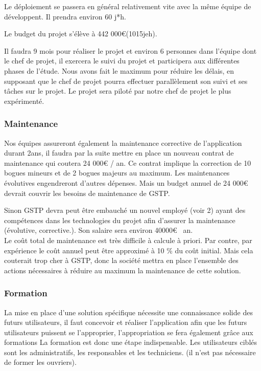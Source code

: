 \begin{description}
\begin{enumerate}
Le déploiement se passera en général relativement vite avec la même équipe de développent. Il prendra environ 60 j*h.

Le budget du projet s'élève à 442 000€(1015jeh).

Il faudra 9 mois pour réaliser le projet et environ 6 personnes dans l'équipe dont le chef de projet, il exercera le suivi du projet et participera aux différentes phases de l'étude. Nous avons fait le maximum pour réduire les délais, en supposant que le chef de projet pourra effectuer parallèlement son suivi et ses tâches sur le projet. Le projet sera piloté par notre chef de projet le plus expérimenté.

\subsubsection{Maintenance}

Nos équipes assureront également la maintenance corrective de l'application durant 2ans, il faudra par la suite mettre en place un nouveau contrat de maintenance qui coutera 24 000€ / an. Ce contrat implique la correction de 10 bogues mineurs et de 2 bogues majeurs au maximum. Les maintenances évolutives engendreront d'autres dépenses. Mais un budget annuel de 24 000€ devrait couvrir les besoins de maintenance de GSTP.

Sinon GSTP devra peut être embauché un nouvel employé (voir 2) ayant des compétences dans les technologies du projet afin d'assurer la maintenance (évolutive, corrective.). Son salaire sera environ 40000€ \ an.\\

Le coût total de maintenance est très difficile à calcule à priori. 
Par contre, par expérience le coût annuel peut être approximé à  10 \% du coût initial. Mais cela couterait trop cher à GSTP, donc la société mettra
en place l'ensemble des actions nécessaires à réduire au maximum la maintenance de cette solution.

\subsubsection{Formation}
    La mise en place d'une solution spécifique nécessite une connaissance solide des futurs utilisateurs, il faut concevoir et réaliser l'application afin que les futurs utilisateurs puissent se l'approprier, l'appropriation se fera également grâce aux formations
      La formation est donc une étape indispensable. Les utilisateurs ciblés sont les administratifs, les responsables et les techniciens. (il n'est pas nécessaire de former les ouvriers).\\


\end{enumerate}
\end{description}

